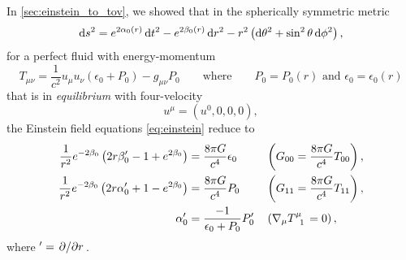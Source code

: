 In \cref{sec:einstein_to_tov}, we showed that in the spherically symmetric metric
\begin{equation}
	\mathop{}\!\mathrm{d} s^2 = e^{2 \alpha_0(r)} \mathop{}\!\mathrm{d} t^2 - e^{2 \beta_0(r)} \mathop{}\!\mathrm{d} r^2 - r^2 \left( \mathop{}\!\mathrm{d} \theta^2 + \sin^2 \theta \mathop{}\!\mathrm{d} \phi^2 \right) ,
\end{equation}
for a perfect fluid with energy-momentum
\begin{equation}
	T_{\mu \nu} = \frac{1}{c^2} u_\mu u_\nu (\epsilon_0 + P_0) - g_{\mu \nu} P_0
	\qquad \text{where} \qquad
	P_0 = P_0(r) \text{ and } \epsilon_0 = \epsilon_0(r)
\label{eq:nstars:energy_momentum}
\end{equation}
that is in \emph{equilibrium} with four-velocity
\begin{equation}
	u^\mu = (u^0, 0, 0, 0) ,
\label{eq:nstars:velocity_equilibrium}
\end{equation}
the Einstein field equations \eqref{eq:einstein} reduce to
\begin{subequations}%
\begin{align}%
	\frac{1}{r^2} e^{-2 \beta_0} \left( 2 r \beta_0' - 1 + e^{2 \beta_0} \right)  &= \frac{8 \pi G}{c^4} \epsilon_0   && \left( G_{00} = \frac{8 \pi G}{c^4} T_{00} \right) , \label{eq:nstars:field_equations_equilibrium_00} \\
	\frac{1}{r^2} e^{-2 \beta_0} \left( 2 r \alpha_0' + 1 - e^{2 \beta_0} \right) &= \frac{8 \pi G}{c^4} P_0          && \left( G_{11} = \frac{8 \pi G}{c^4} T_{11} \right) , \label{eq:nstars:field_equations_equilibrium_11} \\
	\alpha_0'                                                                     &= \frac{-1}{\epsilon_0 + P_0} P_0' && \left( \nabla_\mu T\indices{^\mu_1} = 0 \right)    , \label{eq:nstars:field_equations_equilibrium_T}
\end{align}%
\label{eq:nstars:field_equations_equilibrium}%
\end{subequations}%
where $' = \pdv{}/{r}$.

